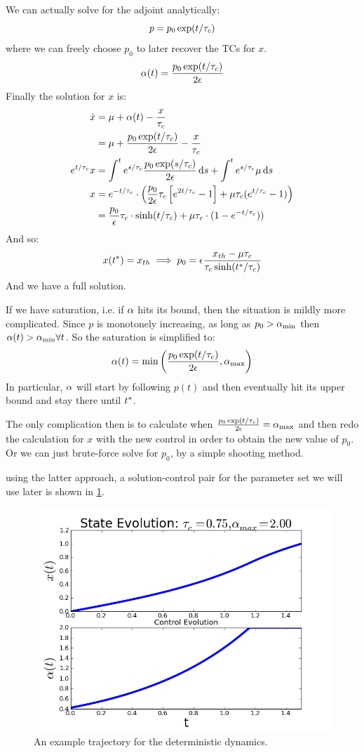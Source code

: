 \documentclass{article}
\begin{document}
We can actually solve for the adjoint analytically: 
$$
p = p_0 \exp(t / { \tau_{c} })
$$
where we can freely choose $p_0$ to later recover the TCs for $x$.
$$
{\alpha}(t) = \frac{p_0 \exp(t / { \tau_{c} })}{2{\epsilon}}
$$
Finally the solution for $x$ is:
\begin{align*}
\dot{x} & = {\mu } + {\alpha}(t) -  \frac{x}{{ \tau_{c} }}
\\ & = {\mu } +  \frac{p_0 \exp(t / { \tau_{c} })}{2{\epsilon}} - \frac{x}{{ \tau_{c} }}
\\
e^{t/{ \tau_{c} }}x &= \int^t e^{s/{ \tau_{c} }}\frac{p_0 \exp(s / { \tau_{c} })}{2{\epsilon}} \, \mathrm{d} s +
				\int^t e^{s/{ \tau_{c} }}{\mu } \, \mathrm{d} s  
\\
x &= e^{-t/{ \tau_{c} }} \cdot \left( \frac{p_0 }{2{\epsilon}} { \tau_{c} } \left[  e^{2 t / { \tau_{c} }} -1
\right] + {\mu }{ \tau_{c} } (e^{t/{ \tau_{c} }} - 1)\right)
\\
&= \frac{p_0 }{{\epsilon}} { \tau_{c} } \cdot  \sinh (t/ { \tau_{c} }) + {\mu }{ \tau_{c} } \cdot( 1 - e^{-t/{ \tau_{c} }}))
\end{align*}
And so: 
$$
x({ t^* }) = { x_{th} } \implies p_0 = {\epsilon} \frac{ { x_{th} } - {\mu }{ \tau_{c} }  }{ { \tau_{c} } \sinh ({ t^* }/ { \tau_{c} }) }
$$
And we have a full solution.

If we have saturation, i.e. if ${\alpha}$ hits its bound, then the situation is mildly
more complicated. Since $p$ is monotonely increasing, as long as $p_0 >
{ {\alpha}_{\textrm{min}} }$ then ${\alpha}(t) > { {\alpha}_{\textrm{min}} } \forall t$. So the saturation is simplified to:
\begin{equation}
{\alpha}(t) = \min \left(\frac{p_0 \exp(t / { \tau_{c} })}{2{\epsilon}} , { {\alpha}_{\textrm{max}} } \right)
\label{eq:deterministic_control_bounds}
\end{equation}
In particular, ${\alpha}$ will start by following $p(t)$ and then eventually hit its
upper bound and stay there until ${ t^* }$. 

The only complication then is to calculate when $\frac{p_0 \exp(t / { \tau_{c} })}{2{\epsilon}} =
{ {\alpha}_{\textrm{max}} }$ and then redo the calculation for $x$ with the new control in order to
obtain the new value of $p_0$. Or we can just brute-force solve for $p_0$, by a
simple shooting method. 

using the latter approach, a solution-control pair for the parameter set we will
use later is shown in \cref{fig:deterministic_soln_controls}. 
\begin{figure}[htp]
\begin{center}
  \includegraphics[width=.7\textwidth]{Figs/ControlSimulator/deterministic_example.png}
  \caption[]{An example trajectory for the deterministic dynamics. }
  \label{fig:deterministic_soln_controls}
\end{center}
\end{figure}
\end{document}
